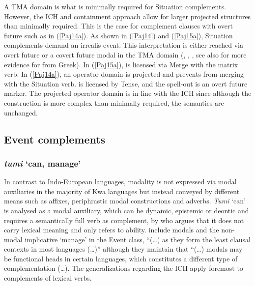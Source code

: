 \documentclass[output=paper]{langscibook}
\begin{document}
A TMA domain is what is minimally required for Situation complements. However, the ICH and containment approach allow for larger projected structures than minimally required. This is the case for complement clauses with overt future such as in (\ref{Paj14a}). As shown in (\ref{Paj14}) and (\ref{Paj15a}), Situation complements demand an irrealis event. This interpretation is either reached via overt future or a covert future modal  in the TMA domain (\citealt{todorovickwurmbrand2020}, \citealt{wurmbrand2014a}, \citealt{todorovic2015}, see also \citet{wurmbrandlohninger2020} for more evidence for  from Greek). In (\ref{Paj15a}),  is licensed via Merge with the matrix verb. In (\ref{Paj14a}), an operator domain is projected and prevents  from merging with the Situation verb.  is licensed by Tense, and the spell-out is an overt future marker. The projected operator domain is in line with the ICH since although the construction is more complex than minimally required, the semantics are unchanged.  

\subsection{Event complements}\label{Pajsect:3.3}

\subsubsection{\textit{tumi} `can, manage'}

In contrast to Indo-European languages, modality is not expressed via modal auxiliaries in the majority of Kwa languages but instead conveyed by different means such as affixes, periphrastic modal constructions and adverbs. \emph{Tumi} ‘can’ is analysed as a modal auxiliary, which can be dynamic, epistemic or deontic and requires a semantically full verb as complement, by \citet{owusu2014} who argues that it does not carry lexical meaning and only refers to ability. \citet{wurmbrandlohninger2020} include modals and the non-modal implicative ‘manage’ in the Event class, “(…) as they form the least clausal contexts in most languages (…)” although they maintain that “(…) modals may be functional heads in certain languages, which constitutes a different type of complementation (…). The generalizations regarding the ICH apply foremost to complements of lexical verbs.

\begin{exe}

\end{exe}
\end{document}

